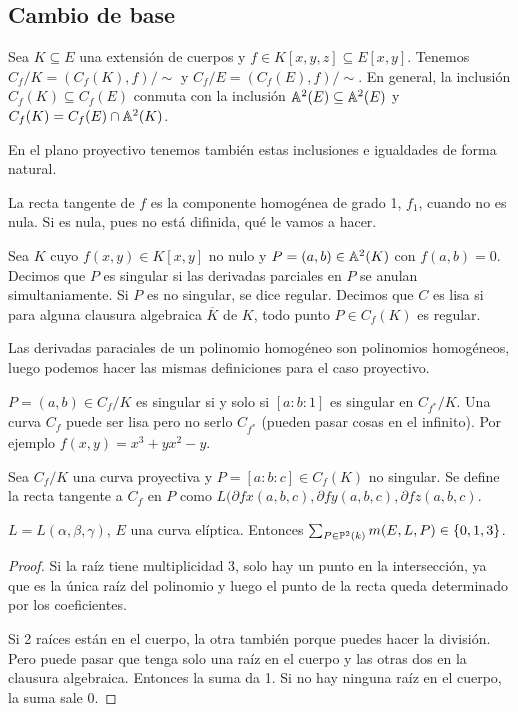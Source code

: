 \documentclass[CR.tex]{subfiles}
\begin{document}
\subsection{Cambio de base}
Sea $K\subseteq E$ una extensión de cuerpos y $f\in K[x,y,z]\subseteq E[x,y]$. Tenemos $C_f/K=(C_f(K),f)/\sim$ y $C_f/E=(C_f(E),f)/\sim$. En general, la inclusión $C_f(K)\subseteq C_f(E)$ conmuta con la inclusión $\mathbb{A}^2(E)\subseteq \mathbb{A}^2(E)$ y $C_f(K)=C_f(E)\cap \mathbb{A}^2(K)$. 

En el plano proyectivo tenemos también estas inclusiones e igualdades de forma natural. 

\begin{defi}
La recta tangente de $f$ es la componente homogénea de grado 1, $f_1$, cuando no es nula. Si es nula, pues no está difinida, qué le vamos a hacer.
\end{defi}

\begin{defi}
Sea $K$ cuyo $f(x,y)\in K[x,y]$ no nulo y $P=(a,b)\in \mathbb{A}^2(K)$ con $f(a,b)=0$. Decimos que $P$ es singular si las derivadas parciales en $P$ se anulan simultaniamente. Si $P$ es no singular, se dice regular. Decimos que $C$ es lisa si para alguna clausura algebraica $\overline{K}$ de $K$, todo punto $P\in C_f(K)$ es regular. 
\end{defi}

Las derivadas paraciales de un polinomio homogéneo son polinomios homogéneos, luego podemos hacer las mismas definiciones para el caso proyectivo.

\begin{nota}
$P=(a,b)\in C_f/K$ es singular si y solo si $[a:b:1]$ es singular en $C_{f^*}/K$. Una curva $C_f$ puede ser lisa pero no serlo $C_{f^*}$ (pueden pasar cosas en el infinito). Por ejemplo $f(x,y)=x^3+yx^2-y$.
\end{nota}
\begin{defi}
Sea $C_f/K$ una curva proyectiva y $P=[a:b:c]\in C_f(K)$ no singular. Se define la recta tangente a $C_f$ en $P$ como $L(\partial{f}{x}(a,b,c),\partial{f}{y}(a,b,c),\partial{f}{z}(a,b,c)$. 
\end{defi}

\begin{lemma}[Satz 2.3.8]
$L=L(\alpha,\beta,\gamma)$, $E$ una curva elíptica. Entonces $\sum_{P\in\mathbb{P}^2(k)}m(E,L,P)\in\{0,1,3\}$.
\end{lemma}
\begin{proof}
Si la raíz tiene multiplicidad 3, solo hay un punto en la intersección, ya que es la única raíz del polinomio y luego el punto de la recta queda determinado por los coeficientes. 


Si 2 raíces están en el cuerpo, la otra también porque puedes hacer la división. Pero puede pasar que tenga solo una raíz en el cuerpo y las otras dos en la clausura algebraica. Entonces la suma da 1. Si no hay ninguna raíz en el cuerpo, la suma sale 0. 
\end{proof}
\end{document}
